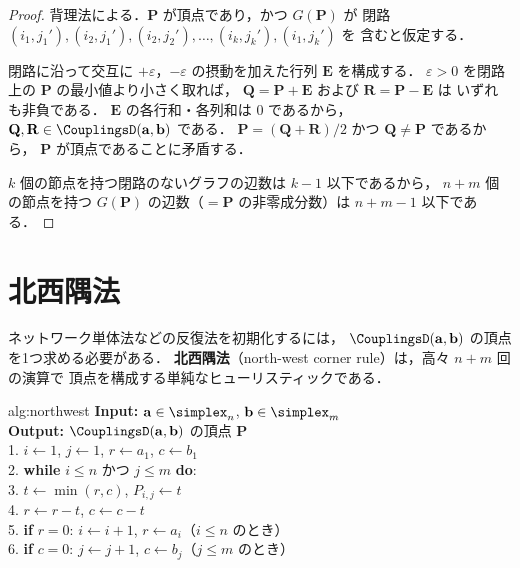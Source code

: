 \begin{proof}
  背理法による．$\mathbf{P}$ が頂点であり，かつ $G(\mathbf{P})$ が
  閉路 $(i_1, j_1'), (i_2, j_1'), (i_2, j_2'), \ldots, (i_k, j_k'), (i_1, j_k')$ を
  含むと仮定する．

  閉路に沿って交互に $+\varepsilon$，$-\varepsilon$ の摂動を加えた行列
  $\mathbf{E}$ を構成する．
  $\varepsilon > 0$ を閉路上の $\mathbf{P}$ の最小値より小さく取れば，
  $\mathbf{Q} = \mathbf{P} + \mathbf{E}$ および $\mathbf{R} = \mathbf{P} - \mathbf{E}$ は
  いずれも非負である．
  $\mathbf{E}$ の各行和・各列和は $0$ であるから，
  $\mathbf{Q}, \mathbf{R} \in \CouplingsD(\mathbf{a}, \mathbf{b})$ である．
  $\mathbf{P} = (\mathbf{Q} + \mathbf{R}) / 2$ かつ $\mathbf{Q} \neq \mathbf{P}$ であるから，
  $\mathbf{P}$ が頂点であることに矛盾する．

  $k$ 個の節点を持つ閉路のないグラフの辺数は $k - 1$ 以下であるから，
  $n + m$ 個の節点を持つ $G(\mathbf{P})$ の辺数（$= \mathbf{P}$ の非零成分数）は
  $n + m - 1$ 以下である．
\end{proof}

\section{北西隅法}
\label{sec:northwest}

ネットワーク単体法などの反復法を初期化するには，
$\CouplingsD(\mathbf{a}, \mathbf{b})$ の頂点を1つ求める必要がある．
\textbf{北西隅法}（north-west corner rule）は，高々 $n + m$ 回の演算で
頂点を構成する単純なヒューリスティックである．

\begin{algorithm}{alg:northwest}
  \textbf{Input:} $\mathbf{a} \in \simplex_n$, $\mathbf{b} \in \simplex_m$ \\
  \textbf{Output:} $\CouplingsD(\mathbf{a}, \mathbf{b})$ の頂点 $\mathbf{P}$ \\[4pt]
  1. $i \leftarrow 1$, $j \leftarrow 1$, $r \leftarrow a_1$, $c \leftarrow b_1$ \\
  2. \textbf{while} $i \leq n$ かつ $j \leq m$ \textbf{do}: \\
  3. \quad $t \leftarrow \min(r, c)$, \quad $P_{i,j} \leftarrow t$ \\
  4. \quad $r \leftarrow r - t$, \quad $c \leftarrow c - t$ \\
  5. \quad \textbf{if} $r = 0$: $i \leftarrow i + 1$, $r \leftarrow a_i$（$i \leq n$ のとき） \\
  6. \quad \textbf{if} $c = 0$: $j \leftarrow j + 1$, $c \leftarrow b_j$（$j \leq m$ のとき）
\end{algorithm}

